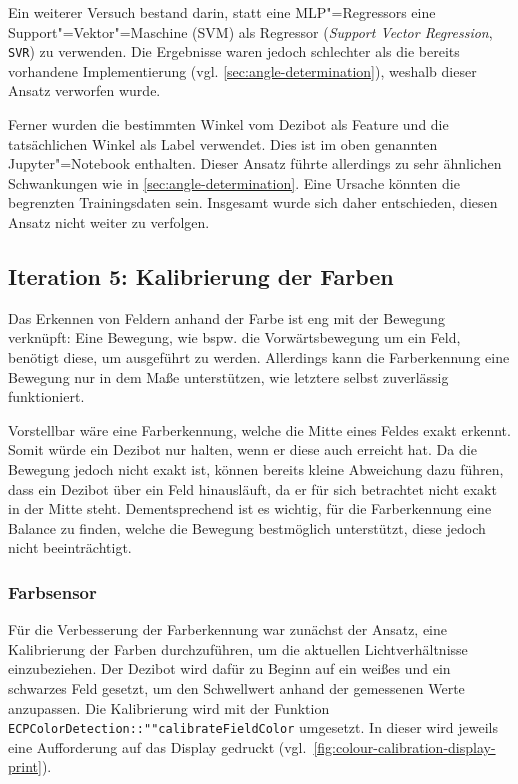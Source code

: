 {Ein weiterer Versuch bestand darin, statt eine MLP"=Regressors eine Support"=Vektor"=Maschine (SVM) als Regressor (\emph{Support Vector Regression}, \texttt{SVR}) zu verwenden. Die Ergebnisse waren jedoch schlechter als die bereits vorhandene Implementierung (vgl. \autoref{sec:angle-determination}), weshalb dieser Ansatz verworfen wurde. 

Ferner wurden die bestimmten Winkel vom Dezibot als Feature und die tatsächlichen Winkel als Label verwendet. Dies ist im oben genannten Jupyter"=Notebook enthalten. Dieser Ansatz führte allerdings zu sehr ähnlichen Schwankungen wie in \autoref{sec:angle-determination}. Eine Ursache könnten die begrenzten Trainingsdaten sein. Insgesamt wurde sich daher entschieden, diesen Ansatz nicht weiter zu verfolgen.


\subsection{Iteration 5: Kalibrierung der Farben}
\label{sec:colour-calibration}

Das Erkennen von Feldern anhand der Farbe ist eng mit der Bewegung verknüpft: Eine Bewegung, wie bspw. die Vorwärtsbewegung um ein Feld, benötigt diese, um ausgeführt zu werden. Allerdings kann die Farberkennung eine Bewegung nur in dem Maße unterstützen, wie letztere selbst zuverlässig funktioniert.

Vorstellbar wäre eine Farberkennung, welche die Mitte eines Feldes exakt erkennt. Somit würde ein Dezibot nur halten, wenn er diese auch erreicht hat. Da die Bewegung jedoch nicht exakt ist, können bereits kleine Abweichung dazu führen, dass ein Dezibot über ein Feld hinausläuft, da er für sich betrachtet nicht exakt in der Mitte steht. Dementsprechend ist es wichtig, für die Farberkennung eine Balance zu finden, welche die Bewegung bestmöglich unterstützt, diese jedoch nicht beeinträchtigt.


\subsubsection{Farbsensor}
\label{sec:colour-calibration-colour-sensor}

Für die Verbesserung der Farberkennung war zunächst der Ansatz, eine Kalibrierung der Farben durchzuführen, um die aktuellen Lichtverhältnisse einzubeziehen. Der Dezibot wird dafür zu Beginn auf ein weißes und ein schwarzes Feld gesetzt, um den Schwellwert anhand der gemessenen Werte anzupassen. Die Kalibrierung wird mit der Funktion \texttt{ECP\-Color\-Detection::""calibrate\-Field\-Color} umgesetzt. In dieser wird jeweils eine Aufforderung auf das Display gedruckt (vgl.~\autoref{fig:colour-calibration-display-print}).

}

